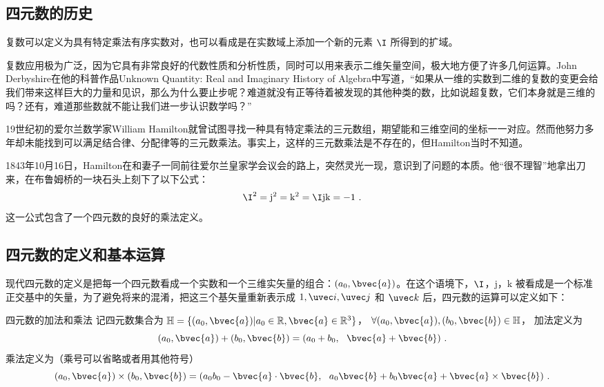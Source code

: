

\subsection{四元数的历史}

复数可以定义为具有特定乘法有序实数对，也可以看成是在实数域上添加一个新的元素 $\I$ 所得到的扩域。

复数应用极为广泛，因为它具有非常良好的代数性质和分析性质，同时可以用来表示二维矢量空间，极大地方便了许多几何运算。John Derbyshire在他的科普作品Unknown Quantity: Real and Imaginary History of Algebra中写道，“如果从一维的实数到二维的复数的变更会给我们带来这样巨大的力量和见识，那么为什么要止步呢？难道就没有正等待着被发现的其他种类的数，比如说超复数，它们本身就是三维的吗？还有，难道那些数就不能让我们进一步认识数学吗？”

19世纪初的爱尔兰数学家William Hamilton就曾试图寻找一种具有特定乘法的三元数组，期望能和三维空间的坐标一一对应。然而他努力多年却未能找到可以满足结合律、分配律等的三元数乘法。事实上，这样的三元数乘法是不存在的，但Hamilton当时不知道。

1843年10月16日，Hamilton在和妻子一同前往爱尔兰皇家学会议会的路上，突然灵光一现，意识到了问题的本质。他“很不理智”地拿出刀来，在布鲁姆桥的一块石头上刻下了以下公式：
\begin{equation}
\I^2=\mathrm{j}^2=\mathrm{k}^2=\I\mathrm{j}\mathrm{k}=-1~.
\end{equation}
这一公式包含了一个四元数的良好的乘法定义。

\subsection{四元数的定义和基本运算}

现代四元数的定义是把每一个四元数看成一个实数和一个三维实矢量的组合：$(a_0, \bvec{a})$。在这个语境下，$\I$，$\mathrm{j}$，$\mathrm{k}$ 被看成是一个标准正交基中的矢量，为了避免将来的混淆，把这三个基矢量重新表示成 $1, \uvec i, \uvec j$ 和 $\uvec k$ 后，四元数的运算可以定义如下：

\begin{definition}{四元数的加法和乘法}\label{def_Quat_1}
记四元数集合为 $\mathbb{H}=\{(a_0, \bvec{a})|a_0\in\mathbb{R}, \bvec{a}\in\mathbb{R}^3\}$， $\forall(a_0, \bvec{a}), (b_0, \bvec{b})\in\mathbb{H}$， 加法定义为
\begin{equation}
(a_0, \bvec{a})+ (b_0, \bvec{b})=(a_0+b_0,\ \ \bvec{a}+\bvec{b})~.
\end{equation}
乘法定义为（乘号可以省略或者用其他符号）
\begin{equation}\label{eq_Quat_1}
(a_0, \bvec{a})\times (b_0, \bvec{b})=(a_0b_0-\bvec{a}\cdot\bvec{b},\ \ a_0\bvec{b}+b_0\bvec{a}+\bvec{a}\times\bvec{b})~.
\end{equation}
\end{definition}

